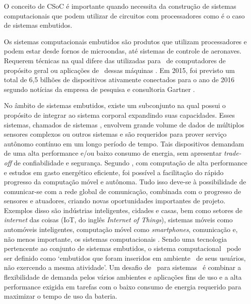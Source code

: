 	O conceito de CSoC é importante quando necessita da construção de sistemas computacionais que podem utilizar de circuitos com processadores como é o caso de sistemas embutidos.

	Os sistemas computacionais embutidos são produtos que utilizam processadores e podem estar desde fornos de microondas, até sistemas de controle de aeronaves.
	Requerem técnicas na qual difere das utilizadas para \design\ de computadores de propósito geral ou aplicações de \software\ dessas máquinas \cite{Wolf1994}.
	Em 2015, foi previsto um total de 6,5 bilhões de dispositivos ativamente conectados para o ano de 2016 segundo notícias da empresa de pesquisa e consultoria Gartner \cite{RobvanderMeulen2015}.

	No âmbito de sistemas embutidos, existe um subconjunto na qual possui o propósito de integrar ao sistema corporal expandindo suas capacidades.
	Esses sistemas, chamados de sistemas \wearables, envolvem grande volume de dados de múltiplos sensores complexos ou outros sistemas e são requeridos para prover serviço autônomo contínuo em um longo período de tempo.
	Tais dispositivos demandam de uma alta performance e/ou baixo consumo de energia, sem apresentar \textit{trade-off} de confiabilidade e segurança. %
	Segundo \cite{Jozwiak2017}, com computação de alta performance e estudos em gasto energético eficiente, foi possível a facilitação do rápido progresso da computação móvel e autônoma.
	Tudo isso deve-se à possibilidade de comunicar-se com a rede global de comunicação, combinada com o progresso de sensores e atuadores, criando novas oportunidades importantes de projeto.
	Exemplos disso são indústrias inteligentes, cidades e casas, bem como setores de \textit{internet} das coisas (IoT, do inglês \textit{Internet of Things}), sistemas móveis como automóveis inteligentes, computação móvel como \textit{smartphones}, comunicação e, não menos importante, os sistemas computacionais \wearable.
	Sendo uma tecnologia pertencente ao conjunto de sistemas embutidos, o sistema computacional \wearable\ pode ser definido como `embutidos que foram inseridos em ambiente \mobile\ de seus usuários, não exercendo a mesma atividade'.
	Um desafio de \design\ para sistemas \wearable\ é combinar a flexibilidade de demanda pelos vários ambientes e aplicações fins de uso e a alta performance exigida em tarefas com o baixo consumo de energia requerido para maximizar o tempo de uso da bateria.


